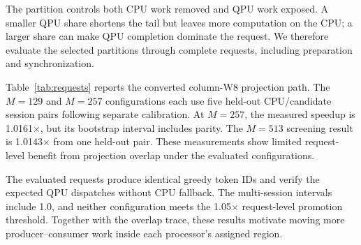 \documentclass[sigplan,screen,review]{acmart}
\begin{document}
The partition controls both CPU work removed and QPU work exposed. A smaller QPU share shortens the tail but leaves more computation on the CPU; a larger share can make QPU completion dominate the request. We therefore evaluate the selected partitions through complete requests, including preparation and synchronization.

Table~\ref{tab:requests} reports the converted column-W8 projection path. The $M=129$ and $M=257$ configurations each use five held-out CPU/candidate session pairs following separate calibration. At $M=257$, the measured speedup is 1.0161$\times$, but its bootstrap interval includes parity. The $M=513$ screening result is 1.0143$\times$ from one held-out pair. These measurements show limited request-level benefit from projection overlap under the evaluated configurations.

\begin{table}[t]
\centering
\caption{Complete-request latency for column-W8 \texttt{ffn\_up} overlap. $M$ is the observed projection row count. Confidence intervals use paired session resampling; the single-pair screen has no interval.}
\label{tab:requests}
\small
{}
\end{table}

The evaluated requests produce identical greedy token IDs and verify the expected QPU dispatches without CPU fallback. The multi-session intervals include 1.0, and neither configuration meets the 1.05$\times$ request-level promotion threshold. Together with the overlap trace, these results motivate moving more producer--consumer work inside each processor's assigned region.
\end{document}
